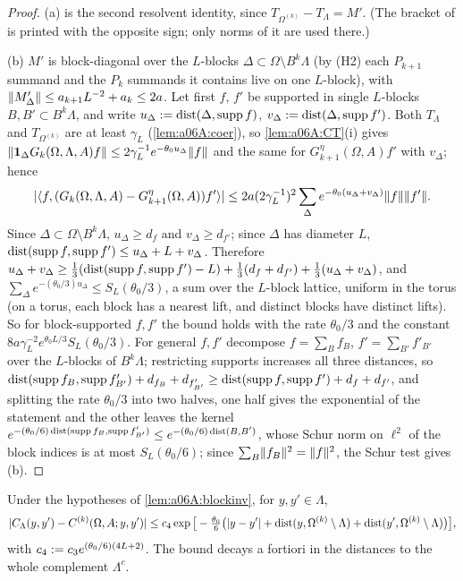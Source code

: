 \begin{proof}
(a) is the second resolvent identity, since $T_{\Omega^{(k)}}-T_\Lambda=M'$. (The bracket of \cite[(3.9)]{Ba4} is printed with the opposite sign; only norms of it are used there.)

(b) $M'$ is block-diagonal over the $L$-blocks $\Delta\subset\Omega\setminus B^k\Lambda$ (by (H2) each $P_{k+1}$ summand and the $P_k$ summands it contains live on one $L$-block), with $\lVert M'_\Delta\rVert\le a_{k+1}L^{-2}+a_k\le2a$. Let first $f$, $f'$ be supported in single $L$-blocks $B,B'\subset B^k\Lambda$, and write $u_\Delta:=\operatorname{dist}(\Delta,\operatorname{supp} f)$, $v_\Delta:=\operatorname{dist}(\Delta,\operatorname{supp} f')$. Both $T_\Lambda$ and $T_{\Omega^{(k)}}$ are at least $\gamma_L$ (\cref{lem:a06A:coer}), so \cref{lem:a06A:CT}(i) gives $\lVert \mathbf 1_\Delta G_k(\Omega,\Lambda,A)f\rVert\le2\gamma_L^{-1}e^{-\theta_0u_\Delta}\lVert f\rVert$ and the same for $G^\eta_{k+1}(\Omega,A)f'$ with $v_\Delta$; hence
\[
|\langle f,(G_k(\Omega,\Lambda,A)-G^\eta_{k+1}(\Omega,A))f'\rangle|\le2a(2\gamma_L^{-1})^2\sum_\Delta e^{-\theta_0(u_\Delta+v_\Delta)}\lVert f\rVert\lVert f'\rVert .
\]
Since $\Delta\subset\Omega\setminus B^k\Lambda$, $u_\Delta\ge d_f$ and $v_\Delta\ge d_{f'}$; since $\Delta$ has diameter $L$, $\operatorname{dist}(\operatorname{supp} f,\operatorname{supp} f')\le u_\Delta+L+v_\Delta$. Therefore $u_\Delta+v_\Delta\ge\frac13(\operatorname{dist}(\operatorname{supp} f,\operatorname{supp} f')-L)+\frac13(d_f+d_{f'})+\frac13(u_\Delta+v_\Delta)$, and $\sum_\Delta e^{-(\theta_0/3)u_\Delta}\le S_L(\theta_0/3)$, a sum over the $L$-block lattice, uniform in the torus (on a torus, each block has a nearest lift, and distinct blocks have distinct lifts). So for block-supported $f,f'$ the bound holds with the rate $\theta_0/3$ and the constant $8a\gamma_L^{-2}e^{\theta_0L/3}S_L(\theta_0/3)$. For general $f,f'$ decompose $f=\sum_Bf_B$, $f'=\sum_{B'}f'_{B'}$ over the $L$-blocks of $B^k\Lambda$; restricting supports increases all three distances, so $\operatorname{dist}(\operatorname{supp} f_B,\operatorname{supp} f'_{B'})+d_{f_B}+d_{f'_{B'}}\ge\operatorname{dist}(\operatorname{supp} f,\operatorname{supp} f')+d_f+d_{f'}$, and splitting the rate $\theta_0/3$ into two halves, one half gives the exponential of the statement and the other leaves the kernel $e^{-(\theta_0/6)\operatorname{dist}(\operatorname{supp} f_B,\operatorname{supp} f'_{B'})}\le e^{-(\theta_0/6)\operatorname{dist}(B,B')}$, whose Schur norm on $\ell^2$ of the block indices is at most $S_L(\theta_0/6)$; since $\sum_B\lVert f_B\rVert^2=\lVert f\rVert^2$, the Schur test gives (b).
\end{proof}

\begin{lemma}\label{lem:a06A:CLdiff}
Under the hypotheses of \cref{lem:a06A:blockinv}, for $y,y'\in\Lambda$,
\[
|C_\Lambda(y,y')-C^{(k)}(\Omega,A;y,y')|\le c_4\exp\big[-\tfrac{\theta_0}6\big(|y-y'|+\operatorname{dist}(y,\Omega^{(k)}\setminus\Lambda)+\operatorname{dist}(y',\Omega^{(k)}\setminus\Lambda)\big)\big],
\]
with $c_4:= c_3e^{(\theta_0/6)(4L+2)}$. The bound decays a fortiori in the distances to the whole complement $\Lambda^c$.
\end{lemma}

